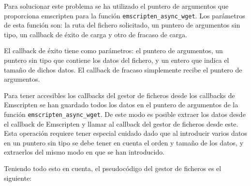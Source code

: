 Para solucionar este problema se ha utilizado el puntero de argumentos que proporciona emscripten para la función \texttt{emscripten\_async\_wget}. Los parámetros de esta función son: la ruta del fichero solicitado, un puntero de argumentos sin tipo, un callback de éxito de carga y otro de fracaso de carga.

El callback de éxito tiene como parámetros: el puntero de argumentos, un puntero sin tipo que contiene los datos del fichero, y un entero que indica el tamaño de dichos datos. El callback de fracaso simplemente recibe el puntero de argumentos.

Para tener accesibles los callbacks del gestor de ficheros desde los callbacks de Emscripten se han guardado todos los datos en el puntero de argumentos de la función \texttt{emscripten\_async\_wget}. De este modo es posible extraer los datos desde el callback de Emscripten y llamar al callback del gestor de ficheros desde este. Esta operación requiere tener especial cuidado dado que al introducir varios datos en un puntero sin tipo se debe tener en cuenta el orden y tamaño de los datos, y extraerlos del mismo modo en que se han introducido.

Teniendo todo esto en cuenta, el pseudocódigo del gestor de ficheros es el siguiente:

